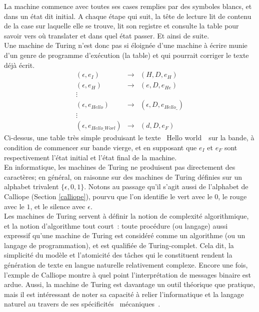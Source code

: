 \documentclass{article}
\begin{document}
				La machine commence avec toutes ses cases remplies par des symboles blancs, et dans un état dit initial. A chaque étape qui suit, la tête de lecture lit de contenu de la case sur laquelle elle se trouve, lit son registre et consulte la table pour savoir vers où translater et dans quel état passer. Et ainsi de suite.\\
				Une machine de Turing n'est donc pas si éloignée d'une machine à écrire munie d'un genre de programme d'exécution (la table) et qui pourrait corriger le texte déjà écrit.  
				\begin{eqnarray*}
				(\epsilon, e_I) &\rightarrow& (H, D, e_H)\\
				(\epsilon, e_H) &\rightarrow& (e, D, e_{He}) \\
				\vdots\\
				(\epsilon, e_{Hello}) &\rightarrow& (\epsilon, D, e_{Hello\_})\\
				\vdots\\
				(\epsilon, e_{Hello\_Worl}) &\rightarrow& (d, D, e_F)
				\end{eqnarray*}
				Ci-dessus, une table très simple produisant le texte \guillemotleft~Hello world~\guillemotright~sur la bande, à condition de commencer sur bande vierge, et en supposant que $e_I$ et $e_F$ sont respectivement l'état initial et l'état final de la machine.\\
				
				En informatique, les machines de Turing ne produisent pas directement des caractères; en général, on raisonne sur des machines de Turing définies sur un alphabet trivalent $\lbrace \epsilon, 0, 1 \rbrace$. Notons au passage qu'il s'agit aussi de l'alphabet de Calliope (Section \ref{calliope}), pourvu que l'on identifie le vert avec le $0$, le rouge avec le $1$, et le silence avec $\epsilon$.\\
				Les machines de Turing servent à définir la notion de complexité algorithmique, et la notion d'algorithme tout court~: toute procédure (ou langage) aussi expressif qu'une machine de Turing est considéré comme un algorithme (ou un langage de programmation), et est qualifiée de Turing-complet. Cela dit, la simplicité du modèle et l'atomicité des tâches qui le constituent rendent la génération de texte en langue naturelle relativement complexe. Encore une fois, l'exmple de Calliope montre à quel point l'interprétation de messages binaire est ardue. Aussi, la machine de Turing est davantage un outil théorique que pratique, mais il est intéressant de noter sa capacité à relier l'informatique et la langage naturel au travers de ses spécificités \guillemotleft~mécaniques~\guillemotright.\\
				
\end{document}
